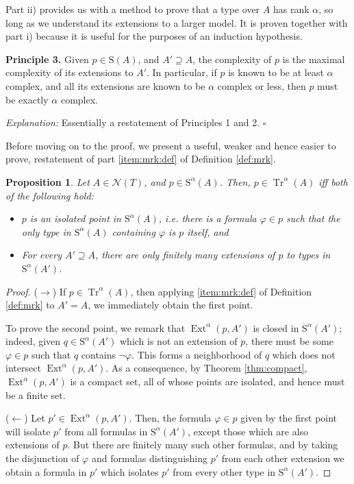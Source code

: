 \documentclass{article}
\newtheorem{prop}[theorem]{Proposition}
\theoremstyle{nonumberplain}
\newtheorem{proof}{Proof}
\newcommand{\calN}{\mathcal{N}}
\newcommand{\Stone}{\mathrm{S}}
\DeclareMathOperator{\Tr}{Tr}
\DeclareMathOperator{\Ext}{Ext}
\begin{document}
Part ii) provides us with a method to prove that a type over $A$ has rank $\alpha$, so long as we understand its extensions to a larger model. It is proven together with part i) because it is useful for the purposes of an induction hypothesis.

\medskip

\textbf{Principle 3.} Given $p \in \Stone(A)$, and $A' \supseteq A$, the complexity of $p$ is the maximal complexity of its extensions to $A'$. In particular, if $p$ is known to be at least $\alpha$ complex, and all its extensions are known to be $\alpha$ complex or less, then $p$ must be exactly $\alpha$ complex.

\smallskip

\textit{Explanation:} Essentially a restatement of Principles 1 and 2. \hfill $\square$

\medskip

Before moving on to the proof, we present a useful, weaker and hence easier to prove, restatement of part \ref{item:mrk:def} of Definition \ref{def:mrk}.

\begin{prop}\label{prop:altv}
Let $A \in \calN(T)$, and $p \in \Stone^\alpha(A)$. Then, $p \in \Tr^\alpha(A)$ iff both of the following hold:
\begin{itemize}
\item $p$ is an isolated point in $\Stone^\alpha(A)$, i.e. there is a formula $\varphi \in p$ such that the only type in $\Stone^\alpha(A)$ containing $\varphi$ is $p$ itself, and
\item For every $A' \supseteq A$, there are only finitely many extensions of $p$ to types in $\Stone^\alpha(A')$.
\end{itemize}
\end{prop}

\begin{proof}
($\rightarrow$) If $p \in \Tr^\alpha(A)$, then applying \ref{item:mrk:def} of Definition \ref{def:mrk} to $A' = A$, we immediately obtain the first point.

To prove the second point, we remark that $\Ext^\alpha(p,A')$ is closed in $\Stone^\alpha(A')$; indeed, given $q \in \Stone^\alpha(A')$ which is not an extension of $p$, there must be some $\varphi \in p$ such that $q$ contains $\neg\varphi$. This forms a neighborhood of $q$ which does not intersect $\Ext^\alpha(p,A')$. As a consequence, by Theorem \ref{thm:compact}, $\Ext^\alpha(p,A')$ is a compact set, all of whose points are isolated, and hence must be a finite set.

\smallskip

($\leftarrow$) Let $p' \in \Ext^\alpha(p,A')$. Then, the formula $\varphi \in p$ given by the first point will isolate $p'$ from all formulas in $\Stone^\alpha(A')$, except those which are also extensions of $p$. But there are finitely many such other formulas, and by taking the disjunction of $\varphi$ and formulas distinguishing $p'$ from each other extension we obtain a formula in $p'$ which isolates $p'$ from every other type in $\Stone^\alpha(A')$.
\end{proof}
\end{document}
